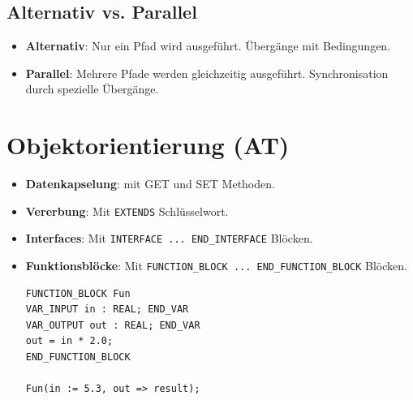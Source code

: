 \documentclass[8pt, landscape]{article}
\newcommand{\algo}[1]{\textbf{\textcolor{blue!60!black}{#1}}}
\newcommand{\datastruct}[1]{\textbf{\textcolor{red!60!black}{#1}}}
\begin{document}
\begin{multicols*}{4}
\subsection*{Alternativ vs. Parallel}

\begin{itemize}
    \item \algo{Alternativ}: Nur ein Pfad wird ausgeführt. Übergänge mit Bedingungen.
    \item \algo{Parallel}: Mehrere Pfade werden gleichzeitig ausgeführt. Synchronisation durch spezielle Übergänge.
\end{itemize}

\section{Objektorientierung (AT)}
\begin{itemize}
    \item \datastruct{Datenkapselung}: mit GET und SET Methoden.
    \item \datastruct{Vererbung}: Mit \lstinline|EXTENDS| Schlüsselwort.
    \item \datastruct{Interfaces}: Mit \lstinline|INTERFACE ... END_INTERFACE| Blöcken.
\item \datastruct{Funktionsblöcke}: {\sloppy Mit \lstinline|FUNCTION_BLOCK ... END_FUNCTION_BLOCK| Blöcken.}
    \begin{lstlisting}[language=ST, numbers=none]
FUNCTION_BLOCK Fun
VAR_INPUT in : REAL; END_VAR
VAR_OUTPUT out : REAL; END_VAR
out = in * 2.0;
END_FUNCTION_BLOCK

Fun(in := 5.3, out => result);

    \end{lstlisting}
\end{itemize}


\end{multicols*}
\end{document}
